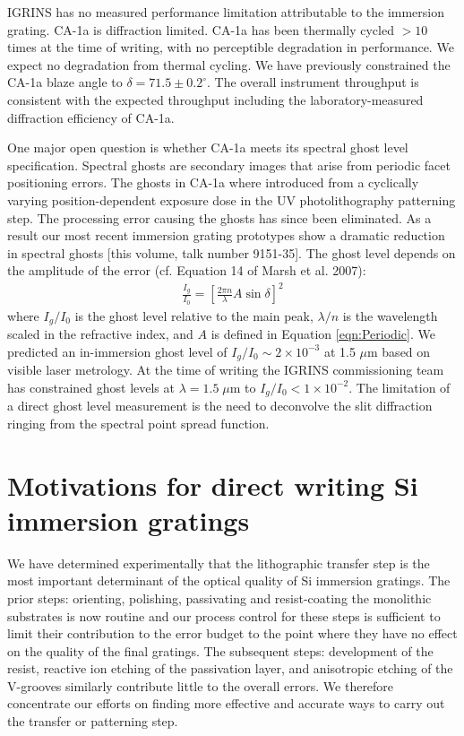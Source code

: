\documentclass[]{spie}  %
\begin{document}
IGRINS has no measured performance limitation attributable to the immersion grating.  CA-1a is diffraction limited.  CA-1a has been thermally cycled $>10$ times at the time of writing, with no perceptible degradation in performance.  We expect no degradation from thermal cycling.  We have previously constrained the CA-1a blaze angle to $\delta = 71.5\pm 0.2^\circ$.  The overall instrument throughput is consistent with the expected throughput including the laboratory-measured diffraction efficiency of CA-1a.

One major open question is whether CA-1a meets its spectral ghost level specification.  Spectral ghosts are secondary images that arise from periodic facet positioning errors\cite{2007sdf..book.....J}. The ghosts in CA-1a where introduced from a cyclically varying position-dependent exposure dose in the UV photolithography patterning step.  The processing error causing the ghosts has since been eliminated.  As a result our most recent immersion grating prototypes show a dramatic reduction in spectral ghosts [this volume, talk number 9151-35]\cite{2014SPIE.BROOKS.GRATINGS}.  The ghost level depends on the amplitude of the error (cf. Equation 14 of Marsh et al. 2007\cite{2007ApOpt..46.3400M}):
\begin{eqnarray}
	\frac{I_g}{I_0}=[ \frac{2\pi n}{\lambda}A \sin{\delta} ]^2	 \label{eqn:GLevel}
\end{eqnarray}
where $I_g/I_0$ is the ghost level relative to the main peak, $\lambda/n$ is the wavelength scaled in the refractive index, and $A$ is defined in Equation \ref{eqn:Periodic}.  We predicted an in-immersion ghost level of $I_g/I_0 \sim2\times10^{-3}$ at 1.5 $\mu$m based on visible laser metrology\cite{2012SPIE.8450E..2SG}.  At the time of writing the IGRINS commissioning team has constrained ghost levels at $\lambda=1.5 \; \mu$m to $I_g/I_0 < 1\times10^{-2}$.  The limitation of a direct ghost level measurement is the need to deconvolve the slit diffraction ringing from the spectral point spread function.

\section{Motivations for direct writing Si immersion gratings}
We have determined experimentally that the lithographic transfer step is the most important determinant of the optical quality of Si immersion gratings.  The prior steps: orienting, polishing, passivating and resist-coating the monolithic substrates is now routine and our process control for these steps is sufficient to limit their contribution to the error budget to the point where they have no effect on the quality of the final gratings\cite{2007ApOpt..46.3400M, 2014SPIE.BROOKS.GRATINGS}.  The subsequent steps: development of the resist, reactive ion etching of the passivation layer, and anisotropic etching of the V-grooves similarly contribute little to the overall errors.  We therefore concentrate our efforts on finding more effective and accurate ways to carry out the transfer or patterning step.  
\end{document}
